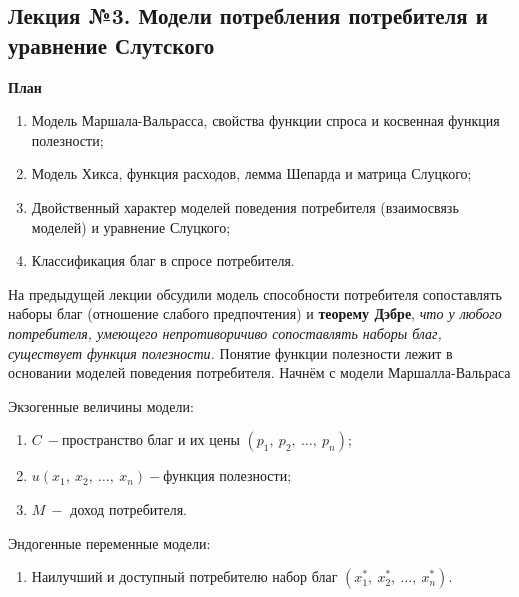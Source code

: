 \documentclass[12pt,a4paper]{article}
\author{Аверьянов Тимофей, Корякин Алексей}
\begin{document}
\begin{center}
\section*{Лекция №3. Модели потребления потребителя и уравнение Слутского}

\textbf{\large План}
\end{center}

\begin{enumerate}
\item Модель Маршала-Вальрасса, свойства функции спроса и косвенная функция полезности;
\item Модель Хикса, функция расходов, лемма Шепарда и матрица Слуцкого;
\item Двойственный характер моделей поведения потребителя (взаимосвязь моделей) и уравнение Слуцкого;
\item Классификация благ в спросе потребителя.
\end{enumerate}

На предыдущей лекции обсудили модель способности потребителя сопоставлять наборы благ (отношение слабого предпочтения) и \textbf{теорему Дэбре}, \textit{что у любого потребителя, умеющего непротиворичиво сопоставлять наборы благ, существует функция полезности. }Понятие функции полезности лежит в основании моделей поведения потребителя. Начнём с модели Маршалла-Вальраса

Экзогенные величины модели:
\begin{enumerate}
\item $\displaystyle C\ -$пространство благ и их цены $\displaystyle ( p_{1} ,\ p_{2} ,\ \dotsc ,\ p_{n})$;
\item $\displaystyle u( x_{1} ,\ x_{2} ,\ \dotsc ,\ x_{n}) -$функция полезности;
\item $\displaystyle M\ -$ доход потребителя.
\end{enumerate}

Эндогенные переменные модели:
\begin{enumerate}
\item Наилучший и доступный потребителю набор благ $\displaystyle \left( x^{*}_{1} ,\ x^{*}_{2} ,\ \dotsc ,\ x^{*}_{n}\right)$.
\end{enumerate}
\end{document}
